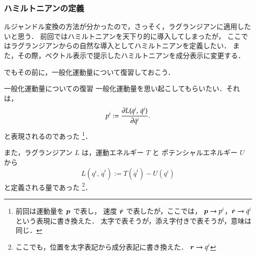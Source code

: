             \subsubsection{ハミルトニアンの定義}
                ルジャンドル変換の方法が分かったので，さっそく，ラグランジアンに適用したいと思う．
                前回ではハミルトニアンを天下り的に導入してしまったが，
                ここではラグランジアンからの自然な導入としてハミルトニアンを定義したい．
                また，その際，ベクトル表示で提示したハミルトニアンを成分表示に変更する．

                でもその前に，一般化運動量について復習しておこう．

                \begin{mysmallsec}{一般化運動量についての復習}
                    一般化運動量を思い起こしてもらいたい．それは，
                        \begin{equation*}
                            p^{i} := \frac{\partial L(q^{i},\,{\dot{q}^{i}})}{\partial {\dot{q}}^{i}} .
                        \end{equation*}
                    と表現されるのであった
                        \footnote{
                            前回は運動量を $\boldsymbol{p}$ で表し， 速度 $\dot{\boldsymbol{r}}$ で表したが，ここでは，
                            $\boldsymbol{p} \to p^{i}$，$\dot{\boldsymbol{r}} \to {\dot{q}}^{i}$ という表現に書き換えた．
                            太字で表そうが，添え字付きで表そうが，意味は同じ．
                        }．

                        また，ラグランジアン $L$ は，運動エネルギー $T$ と ポテンシャルエネルギー $U$ から
                        \begin{equation*}
                            L({q}^{i},\,{\dot{q}}^{i}) := T({\dot{q}}^{i}) - U(q^{i})
                        \end{equation*}
                    と定義される量であった
                        \footnote{
                            ここでも，位置を太字表記から成分表記に書き換えた．
                            $\boldsymbol{r} \to {q}^{i}$
                        }．


\end{mysmallsec}
